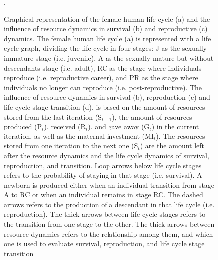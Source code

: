 \documentclass{article}
\begin{document}
\begin{figure}[H]
\caption{Graphical representation of the female human life cycle (a) and the influence of resource dynamics in survival (b) and reproductive (c) dynamics. The female human life cycle (a) is represented with a life cycle graph, dividing the life cycle in four stages: J as the sexually immature stage (i.e. juvenile), A as the sexually mature but without descendants stage (i.e. adult), RC as the stage where individuals reproduce (i.e. reproductive career), and PR as the stage where individuals no longer can reproduce (i.e. post-reproductive). The influence of resource dynamics in survival (b), reproduction (c) and life cycle stage transition (d), is based on the amount of resources stored from the last iteration (S$_{t-1}$), the amount of resources produced (P$_{t}$), received (R$_{t}$), and gave away (G$_{t}$) in the current iteration, as well as the maternal investment (MI$_{t}$). The resources stored from one iteration to the next one (S$_{t}$) are the amount left after the resource dynamics and the life cycle dynamics of survival, reproduction, and transition. Loop arrows below life cycle stages refers to the probability of staying in that stage (i.e. survival). A newborn is produced either when an individual transition from stage A to RC or when an individual remains in stage RC. The dashed arrows refers to the production of a descendant in that life cycle (i.e. reproduction). The thick arrows between life cycle stages refers to the transition from one stage to the other. The thick arrows between resource dynamics refers to the relationship among them, and which one is used to evaluate survival, reproduction, and life cycle stage transition}.
    \label{fig:1}
\end{figure}

\clearpage



\end{document}

